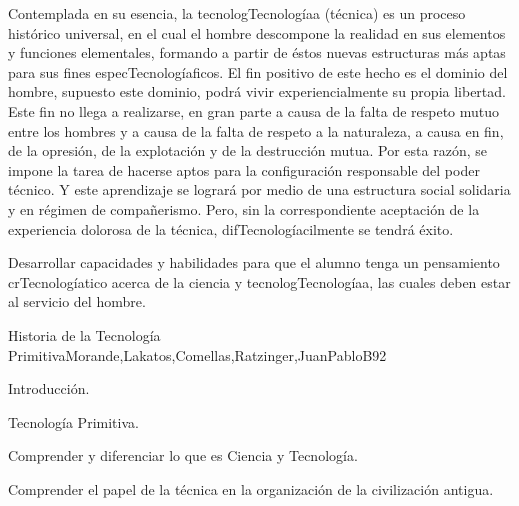 \begin{syllabus}


\begin{justification}

Contemplada en su esencia, la tecnologTecnologíaa (técnica) es un proceso histórico universal, en el cual el hombre descompone la realidad en sus elementos y funciones elementales, formando a partir de éstos nuevas estructuras más aptas para sus fines especTecnologíaficos.
El fin positivo de este hecho es el dominio del hombre,  supuesto este dominio, podrá vivir experiencialmente su propia libertad. Este fin no llega a realizarse, en gran parte a causa de la falta de respeto mutuo entre los hombres y a causa de la falta de respeto a la naturaleza, a causa en fin, de la opresión, de la explotación y de la destrucción mutua.
Por esta razón, se impone la tarea de hacerse aptos para la configuración responsable del poder técnico. Y este aprendizaje se logrará por medio de una estructura social solidaria y en régimen de compañerismo. Pero, sin la correspondiente aceptación de la experiencia dolorosa de la técnica, difTecnologíacilmente se tendrá éxito.
\end{justification}

\begin{goals}
\item Desarrollar capacidades y habilidades para que el alumno tenga un pensamiento crTecnologíatico acerca de  la ciencia y tecnologTecnologíaa, las cuales deben estar al servicio del hombre.
\end{goals}

\begin{outcomes}
\end{outcomes}

\begin{unit}{Historia de la Tecnología Primitiva}{Morande,Lakatos,Comellas,Ratzinger,JuanPabloB}{9}{2}
\begin{topics}
      \item Introducción.
      \item Tecnología Primitiva.
\end{topics}

\begin{unitgoals}
	\item Comprender y diferenciar lo que es Ciencia y Tecnología. 
 	\item Comprender el papel de la técnica en la organización de la civilización antigua.
\end{unitgoals}
\end{unit}


\end{syllabus}
